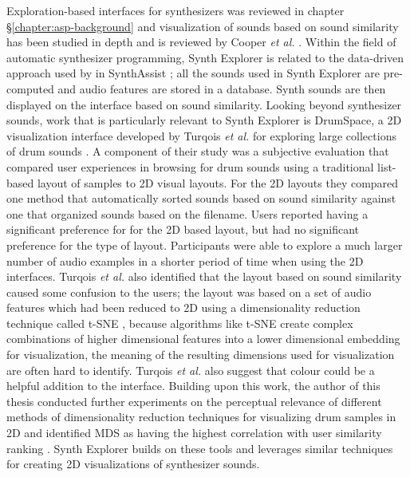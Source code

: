 Exploration-based interfaces for synthesizers was reviewed in chapter \S\ref{chapter:asp-background} and visualization of sounds based on sound similarity has been studied in depth and is reviewed by Cooper \textit{et al.} \cite{cooper2006visualization}. Within the field of automatic synthesizer programming, Synth Explorer is related to the data-driven approach used by in SynthAssist \cite{cartwright2014synthassist}; all the sounds used in Synth Explorer are pre-computed and audio features are stored in a database. Synth sounds are then displayed on the interface based on sound similarity. Looking beyond synthesizer sounds, work that is particularly relevant to Synth Explorer is DrumSpace, a 2D visualization interface developed by Turqois \textit{et al.} for exploring large collections of drum sounds \cite{turquois2016exploring}. A component of their study was a subjective evaluation that compared user experiences in browsing for drum sounds using a traditional list-based layout of samples to 2D visual layouts. For the 2D layouts they compared one method that automatically sorted sounds based on sound similarity against one that organized sounds based on the filename. Users reported having a significant preference for for the 2D based layout, but had no significant preference for the type of layout. Participants were able to explore a much larger number of audio examples in a shorter period of time when using the 2D interfaces. Turqois \textit{et al.} also identified that the layout based on sound similarity caused some confusion to the users; the layout was based on a set of audio features which had been reduced to 2D using a dimensionality reduction technique called t-SNE \cite{van2008visualizing}, because algorithms like t-SNE create complex combinations of higher dimensional features into a lower dimensional embedding for visualization, the meaning of the resulting dimensions used for visualization are often hard to identify. Turqois \textit{ et al.} also suggest that colour could be a helpful addition to the interface. Building upon this work, the author of this thesis conducted further experiments on the perceptual relevance of different methods of dimensionality reduction techniques for visualizing drum samples in 2D and identified MDS as having the highest correlation with user similarity ranking \cite{shier2021manifold}. Synth Explorer builds on these tools and leverages similar techniques for creating 2D visualizations of synthesizer sounds.


